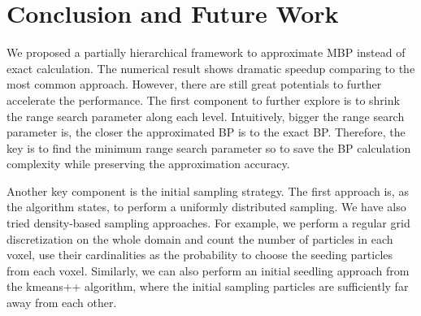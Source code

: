 \section{Conclusion and Future Work}
We proposed a partially hierarchical framework to approximate MBP instead of exact calculation. The numerical result shows dramatic speedup comparing to the most common approach. However, there are still great potentials to further accelerate the performance. The first component to further explore is to shrink the range search parameter along each level. Intuitively, bigger the range search parameter is, the closer the approximated BP is to the exact BP. Therefore, the key is to find the minimum range search parameter so to save the BP calculation complexity while preserving the approximation accuracy. 

Another key component is the initial sampling strategy. The first approach is, as the algorithm states, to perform a uniformly distributed sampling. We have also tried density-based sampling approaches. For example, we perform a regular grid discretization on the whole domain and count the number of particles in each voxel, use their cardinalities as the probability to choose the seeding particles from each voxel. Similarly, we can also perform an initial seedling approach from the kmeans++ algorithm, where the initial sampling particles are sufficiently far away from each other. 


